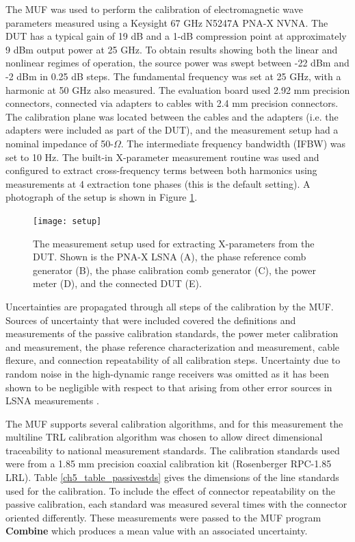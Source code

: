 \documentclass[../thesis/thesis.tex]{subfiles}
\begin{document}
\begin{refsection}
The MUF was used to perform the calibration of electromagnetic wave parameters measured using a Keysight  67 GHz N5247A PNA-X NVNA. The DUT \cite{hittite_amp} has a typical gain of 19 dB and a \mbox{1-dB} compression point at approximately 9 dBm output power at 25 GHz. To obtain results showing both the linear and nonlinear regimes of operation, the source power was swept between -22 dBm and -2 dBm in 0.25 dB steps. The fundamental frequency was set at 25 GHz, with a harmonic at 50 GHz also measured. The evaluation board used 2.92 mm precision connectors, connected via adapters to cables with 2.4 mm precision connectors. The calibration plane was located between the cables and the adapters (i.e. the adapters were included as part of the DUT), and the measurement setup had a nominal impedance of 50-$\Omega$. The intermediate frequency bandwidth (IFBW) was set to 10 Hz. The built-in X-parameter measurement routine was used and configured to extract cross-frequency terms between both harmonics using measurements at 4 extraction tone phases (this is the default setting). A photograph of the setup is shown in Figure \ref{ch5_fig_setup}.

\begin{figure}[t]
	\centering
	\texttt{[image: setup]}
	\caption{The measurement setup used for extracting X-parameters from the DUT. Shown is the PNA-X LSNA (A), the phase reference comb generator (B), the phase calibration comb generator (C), the power meter (D), and the connected DUT (E).}
	\label{ch5_fig_setup}
\end{figure}

Uncertainties are propagated through all steps of the calibration by the MUF. Sources of uncertainty that were included covered the definitions and measurements of the passive calibration standards, the power meter calibration and measurement, the phase reference characterization and measurement, cable flexure, and connection repeatability of all calibration steps. Uncertainty due to random noise in the high-dynamic range receivers was omitted as it has been shown to be negligible with respect to that arising from other error sources in LSNA measurements \cite{Blockley_2007}.

The MUF supports several calibration algorithms, and for this measurement the multiline TRL calibration algorithm \cite{Engen_1979, Marks_1991} was chosen to allow direct dimensional traceability to national measurement standards. The calibration standards used were from a 1.85 mm precision coaxial calibration kit (Rosenberger RPC-1.85 LRL). Table \ref{ch5_table_passivestds} gives the dimensions of the line standards used for the calibration. To include the effect of connector repeatability on the passive calibration, each standard was measured several times with the connector oriented differently. These measurements were passed to the MUF program \textbf{Combine} which produces a mean value with an associated uncertainty.


\end{refsection}
\end{document}
